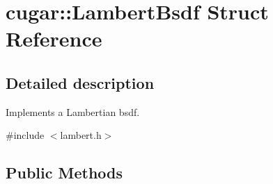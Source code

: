 \hypertarget{structcugar_1_1_lambert_bsdf}{}\section{cugar\+:\+:Lambert\+Bsdf Struct Reference}
\label{structcugar_1_1_lambert_bsdf}


\subsection{Detailed description}
Implements a Lambertian bsdf. 

{\ttfamily \#include $<$lambert.\+h$>$}

\subsection*{Public Methods}
